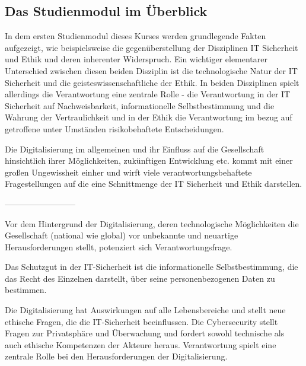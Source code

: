 \documentclass[journal]{IEEEtran}
\begin{document}

\begin{onecolumn}

\section{Das Studienmodul im Überblick}

In dem ersten Studienmodul dieses Kurses werden grundlegende Fakten aufgezeigt, wie beispielsweise
die gegenüberstellung der Disziplinen IT Sicherheit und Ethik und deren inherenter Widerspruch.
Ein wichtiger elementarer Unterschied zwischen diesen beiden Disziplin ist die technologische Natur
der IT Sicherheit und die geisteswissenschaftliche der Ethik. In beiden Disziplinen spielt allerdings
die Verantwortung eine zentrale Rolle -  die Verantwortung in der IT Sicherheit auf Nachweisbarkeit,
informationelle Selbstbestimmung und die Wahrung der Vertraulichkeit und in der Ethik die Verantwortung
im bezug auf getroffene unter Umständen risikobehaftete Entscheidungen. 

Die Digitalisierung im allgemeinen und ihr Einfluss auf die Gesellschaft hinsichtlich ihrer Möglichkeiten,
zukünftigen Entwicklung etc. kommt mit einer großen Ungewissheit einher und wirft viele 
verantwortungsbehaftete Fragestellungen auf die eine Schnittmenge der IT Sicherheit und Ethik darstellen.   


--------------------------


 Vor dem Hintergrund der Digitalisierung, deren technologische Möglichkeiten die Gesellschaft (national wie global) vor unbekannte und neuartige Herausforderungen stellt, potenziert sich Verantwortungsfrage.




Das Schutzgut in der IT-Sicherheit ist die informationelle Selbstbestimmung, die das Recht des Einzelnen darstellt, über seine personenbezogenen Daten zu bestimmen.

 Die Digitalisierung hat Auswirkungen auf alle Lebensbereiche und stellt neue ethische Fragen, die die IT-Sicherheit beeinflussen. Die Cybersecurity stellt Fragen zur Privatsphäre und Überwachung und fordert sowohl technische als auch ethische Kompetenzen der Akteure heraus. Verantwortung spielt eine zentrale Rolle bei den Herausforderungen der Digitalisierung.



\end{onecolumn}
\end{document}
